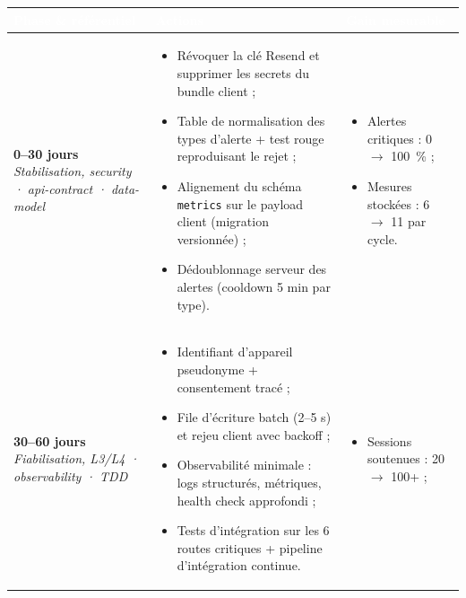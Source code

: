 \documentclass[11pt,a4paper]{article}
\begin{document}
\begin{table}[H]
\centering\small
\begin{tabularx}{\linewidth}{>{\raggedright\arraybackslash}p{2.3cm} >{\raggedright\arraybackslash}X >{\raggedright\arraybackslash}p{3.7cm}}
\toprule
\rowcolor{cwblue} \textcolor{white}{\bf Phase \& référentiel} & \textcolor{white}{\bf Actions} &
\textcolor{white}{\bf Gain mesurable} \\
\midrule
\rowcolor{cwblue!12}
\textbf{0--30 jours}\newline
{\footnotesize\itshape Stabilisation, security · api-contract · data-model}
& \begin{itemize}[leftmargin=1.1em,itemsep=1pt,topsep=1pt,parsep=0pt]
 \item Révoquer la clé Resend et supprimer les secrets du bundle client ;
 \item Table de normalisation des types d'alerte + test rouge reproduisant le rejet ;
 \item Alignement du schéma \texttt{metrics} sur le payload client (migration versionnée) ;
 \item Dédoublonnage serveur des alertes (cooldown 5 min par type).
 \end{itemize}
& \begin{itemize}[leftmargin=1.1em,itemsep=1pt,topsep=1pt,parsep=0pt]
 \item Alertes critiques : 0 $\to$ 100~\% ;
 \item Mesures stockées : 6 $\to$ 11 par cycle.
 \end{itemize} \\
\midrule
\rowcolor{cwblue!12}
\textbf{30--60 jours}\newline
{\footnotesize\itshape Fiabilisation, L3/L4 · observability · TDD}
& \begin{itemize}[leftmargin=1.1em,itemsep=1pt,topsep=1pt,parsep=0pt]
 \item Identifiant d'appareil pseudonyme + consentement tracé ;
 \item File d'écriture batch (2--5 s) et rejeu client avec backoff ;
 \item Observabilité minimale : logs structurés, métriques, health check approfondi ;
 \item Tests d'intégration sur les 6 routes critiques + pipeline d'intégration continue.
 \end{itemize}
& \begin{itemize}[leftmargin=1.1em,itemsep=1pt,topsep=1pt,parsep=0pt]
 \item Sessions soutenues : 20 $\to$ 100+ ;

\end{itemize}
\end{tabularx}
\end{table}
\end{document}
